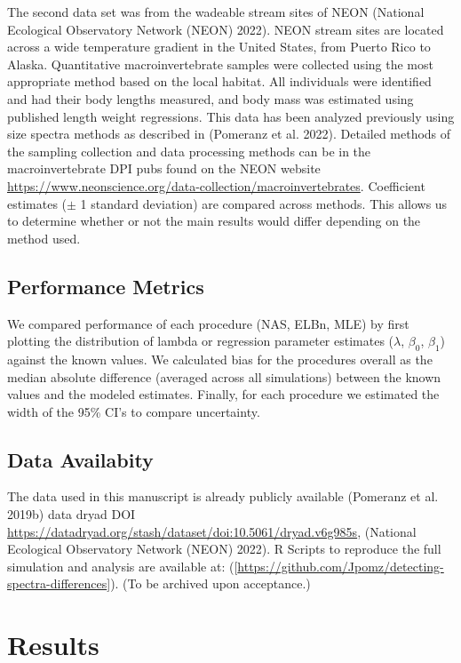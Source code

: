 \documentclass[
]{article}
\begin{document}
The second data set was from the wadeable stream sites of NEON (National
Ecological Observatory Network (NEON) 2022). NEON stream sites are
located across a wide temperature gradient in the United States, from
Puerto Rico to Alaska. Quantitative macroinvertebrate samples were
collected using the most appropriate method based on the local habitat.
All individuals were identified and had their body lengths measured, and
body mass was estimated using published length weight regressions. This
data has been analyzed previously using size spectra methods as
described in (Pomeranz et al. 2022). Detailed methods of the sampling
collection and data processing methods can be in the macroinvertebrate
DPI pubs found on the NEON website
\url{https://www.neonscience.org/data-collection/macroinvertebrates}.
Coefficient estimates (\(\pm\) 1 standard deviation) are compared across
methods. This allows us to determine whether or not the main results
would differ depending on the method used.

\hypertarget{performance-metrics}{%
\subsection{Performance Metrics}\label{performance-metrics}}

We compared performance of each procedure (NAS, ELBn, MLE) by first
plotting the distribution of lambda or regression parameter estimates
(\(\lambda\), \(\beta_{0}\), \(\beta_{1}\)) against the known values. We
calculated bias for the procedures overall as the median absolute
difference (averaged across all simulations) between the known values
and the modeled estimates. Finally, for each procedure we estimated the
width of the 95\% CI's to compare uncertainty.

\hypertarget{data-availabity}{%
\subsection{Data Availabity}\label{data-availabity}}

The data used in this manuscript is already publicly available (Pomeranz
et al. 2019b) data dryad DOI
\url{https://datadryad.org/stash/dataset/doi:10.5061/dryad.v6g985s},
(National Ecological Observatory Network (NEON) 2022). R Scripts to
reproduce the full simulation and analysis are available at:
({[}\url{https://github.com/Jpomz/detecting-spectra-differences}{]}).
(To be archived upon acceptance.)

\hypertarget{results}{%
\section{Results}\label{results}}
\end{document}
